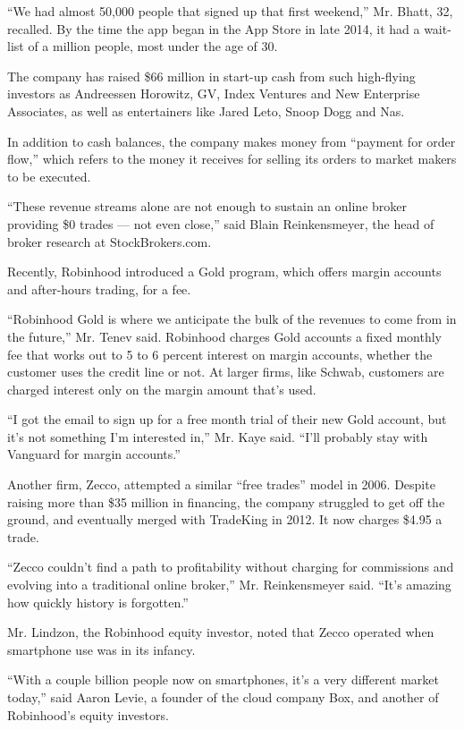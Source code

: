 ``We had almost 50,000 people that signed up that first weekend,'' Mr.
Bhatt, 32, recalled. By the time the app began in the App Store in late
2014, it had a wait-list of a million people, most under the age of 30.

The company has raised \$66 million in start-up cash from such
high-flying investors as Andreessen Horowitz, GV, Index Ventures and New
Enterprise Associates, as well as entertainers like Jared Leto, Snoop
Dogg and Nas.

In addition to cash balances, the company makes money from ``payment for
order flow,'' which refers to the money it receives for selling its
orders to market makers to be executed.

``These revenue streams alone are not enough to sustain an online broker
providing \$0 trades --- not even close,'' said Blain Reinkensmeyer, the
head of broker research at StockBrokers.com.

Recently, Robinhood introduced a Gold program, which offers margin
accounts and after-hours trading, for a fee.

``Robinhood Gold is where we anticipate the bulk of the revenues to come
from in the future,'' Mr. Tenev said. Robinhood charges Gold accounts a
fixed monthly fee that works out to 5 to 6 percent interest on margin
accounts, whether the customer uses the credit line or not. At larger
firms, like Schwab, customers are charged interest only on the margin
amount that's used.

``I got the email to sign up for a free month trial of their new Gold
account, but it's not something I'm interested in,'' Mr. Kaye said.
``I'll probably stay with Vanguard for margin accounts.''

Another firm, Zecco, attempted a similar ``free trades'' model in 2006.
Despite raising more than \$35 million in financing, the company
struggled to get off the ground, and eventually merged with TradeKing in
2012. It now charges \$4.95 a trade.

``Zecco couldn't find a path to profitability without charging for
commissions and evolving into a traditional online broker,'' Mr.
Reinkensmeyer said. ``It's amazing how quickly history is forgotten.''

Mr. Lindzon, the Robinhood equity investor, noted that Zecco operated
when smartphone use was in its infancy.

``With a couple billion people now on smartphones, it's a very different
market today,'' said Aaron Levie, a founder of the cloud company Box,
and another of Robinhood's equity investors.


